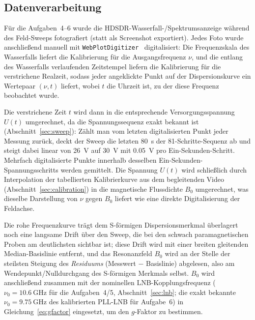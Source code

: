 \documentclass[11pt,a4paper]{article}
\begin{document}
\subsection{Datenverarbeitung}
\label{sec:processing}
Für die Aufgaben~4--6 wurde die HDSDR-Wasserfall-/Spektrumsanzeige während des
Feld-Sweeps fotografiert (statt als Screenshot exportiert). Jedes Foto wurde
anschließend manuell mit \texttt{WebPlotDigitizer}~\cite{webplotdigitizer} digitalisiert: Die
Frequenzskala des Wasserfalls liefert die Kalibrierung für die
Ausgangsfrequenz $\nu$, und die entlang des Wasserfalls verlaufenden
Zeitstempel liefern die Kalibrierung für die verstrichene Realzeit, sodass
jeder angeklickte Punkt auf der Dispersionskurve ein Wertepaar $(\nu, t)$
liefert, wobei $t$ die Uhrzeit ist, zu der diese Frequenz beobachtet wurde.

Die verstrichene Zeit $t$ wird dann in die entsprechende Versorgungsspannung
$U(t)$ umgerechnet, da die Spannungssequenz exakt bekannt ist
(Abschnitt~\ref{sec:sweep}): Zählt man vom letzten digitalisierten Punkt jeder
Messung zurück, deckt der Sweep die letzten \SI{80}{\second} der
81-Schritte-Sequenz ab und steigt dabei linear von \SI{26}{\volt} auf
\SI{30}{\volt} mit \SI{0.05}{\volt} pro Ein-Sekunden-Schritt. Mehrfach
digitalisierte Punkte innerhalb desselben Ein-Sekunden-Spannungsschritts
werden gemittelt. Die Spannung $U(t)$ wird schließlich durch Interpolation
der tabellierten Kalibrierkurve aus dem begleitenden Video
(Abschnitt~\ref{sec:calibration}) in die magnetische Flussdichte $B_0$
umgerechnet, was dieselbe Darstellung von $\nu$ gegen $B_0$ liefert wie eine
direkte Digitalisierung der Feldachse.

Die rohe Frequenzkurve trägt dem S-förmigen Dispersionsmerkmal überlagert noch
eine langsame Drift über den Sweep, die bei den schwach paramagnetischen
Proben am deutlichsten sichtbar ist; diese Drift wird mit einer breiten
gleitenden Median-Basislinie entfernt, und das Resonanzfeld $B_0$ wird an der
Stelle der steilsten Steigung des \emph{Residuums} (Messwert $-$ Basislinie)
abgelesen, also am Wendepunkt/Nulldurchgang des S-förmigen Merkmals selbst.
$B_0$ wird anschließend zusammen mit der nominellen LNB-Kopplungsfrequenz
($\nu_0 = \SI{10.6}{\giga\hertz}$ für die Aufgaben~4/5, Abschnitt~\ref{sec:lnb};
die exakt bekannte $\nu_0 = \SI{9.75}{\giga\hertz}$ des kalibrierten PLL-LNB
für Aufgabe~6) in Gleichung~\eqref{eq:gfactor} eingesetzt, um den $g$-Faktor
zu bestimmen.

\end{document}
